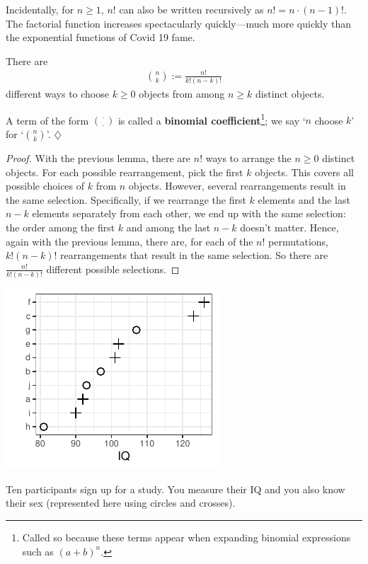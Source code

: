 \documentclass[a4paper]{tufte-book}\usepackage[]{graphicx}\usepackage[]{xcolor}
\newcommand{\term}[1]{\textbf{#1}}
\newcommand*{\parend}[1][$\diamondsuit$]{%
\leavevmode\unskip\penalty9999 \hbox{}\nobreak\hfill
    \quad\hbox{#1}%
}
\begin{document}
Incidentally,
for $n \geq 1$, $n!$ can also be written recursively as $n! = n\cdot (n-1)!$.
The factorial function increases spectacularly quickly---much more quickly
than the exponential functions of Covid 19 fame.

	There are
  \begin{align*}
    {n \choose k} := \frac{n!}{k!(n-k)!}
  \end{align*}
  different ways to choose $k \geq 0$ objects from among $n \geq k$
  distinct objects.
  
  A term of the form ${\cdot \choose \cdot}$ is called a 
  \term{binomial coefficient}\footnote{Called so because these terms
  appear when expanding binomial expressions such as $(a + b)^n$.};
  we say `$n$ choose $k$' for `${n \choose k}$'.
\parend

\begin{proof}
  With the previous lemma, there are $n!$ ways to arrange the $n \geq 0$ distinct objects.
  For each possible rearrangement, pick the first $k$ objects.
  This covers all possible choices of $k$ from $n$ objects.
  However, several rearrangements result in the same selection.
  Specifically, if we rearrange the first $k$ elements and the last $n-k$
  elements separately from each other, we end up with the same selection:
  the order among the first $k$ and among the last $n-k$ doesn't matter.
  Hence, again with the previous lemma, there are, for each of the $n!$ permutations,
  $k!(n-k)!$ rearrangements that result in the same selection.
  So there are $\frac{n!}{k!(n-k)!}$ different possible selections.
\end{proof}



\begin{marginfigure}[4cm]
  \centering
  \includegraphics{figure/partiq-1}
  \caption{Ten participants sign up for a study. You measure their IQ and you also know their sex (represented here using circles and crosses).}
  \label{fig:partiq}
\end{marginfigure}
\end{document}
